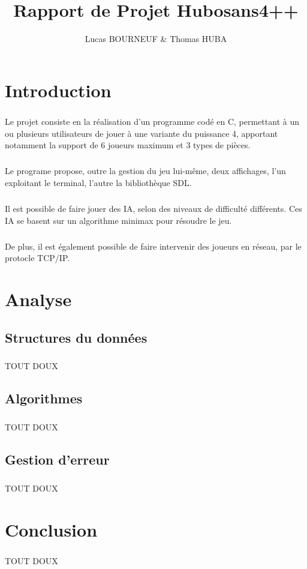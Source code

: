 \documentclass{report}
\title{Rapport de Projet Hubosans4++}
\author{Lucas BOURNEUF \& Thomas HUBA}
\begin{document}
\maketitle


\chapter*{Introduction}
\paragraph*{}
Le projet consiste en la réalisation d'un programme codé en C, permettant à un ou plusieurs utilisateurs de jouer à une variante du puissance 4,
apportant notamment la support de 6 joueurs maximum et 3 types de pièces.
\paragraph*{}
Le programe propose, outre la gestion du jeu lui-même, deux affichages, l'un exploitant le terminal, l'autre la bibliothèque SDL.
\paragraph*{}
Il est possible de faire jouer des IA, selon des niveaux de difficulté différents. Ces IA se basent sur un algorithme minimax pour résoudre le jeu.
\paragraph*{}
De plus, il est également possible de faire intervenir des joueurs en réseau, par le protocle TCP/IP.


\chapter*{Analyse}

\section*{Structures du données}
\paragraph*{}
TOUT DOUX

\section*{Algorithmes}
\paragraph*{}
TOUT DOUX

\section*{Gestion d'erreur}
\paragraph*{}
TOUT DOUX


\chapter*{Conclusion}
\paragraph*{}
TOUT DOUX
\end{document}
